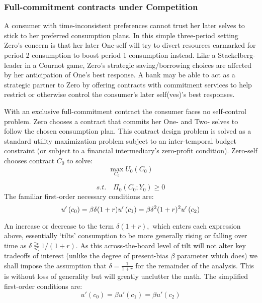 \documentclass[11pt,english]{article}
\theoremstyle{plain}
\theoremstyle{plain}
\theoremstyle{plain}
\begin{document}
\subsubsection{Full-commitment contracts under Competition}

\label{sec-FCC} A consumer with time-inconsistent preferences cannot
trust her later selves to stick to her preferred consumption plans.
In this simple three-period setting Zero's concern is that her later
One-self will try to divert resources earmarked for period 2 consumption
to boost period 1 consumption instead. Like a Stackelberg-leader in
a Cournot game, Zero's strategic saving/borrowing choices are affected
by her anticipation of One's best response. A bank may be able to
act as a strategic partner to Zero by offering contracts with commitment
services to help restrict or otherwise control the consumer's later
self(ves)'s best responses.

With an exclusive full-commitment contract the consumer faces no self-control
problem. Zero chooses a contract that commits her One- and Two- selves
to follow the chosen consumption plan. This contract design problem
is solved as a standard utility maximization problem subject to an
inter-temporal budget constraint (or subject to a financial intermediary's
zero-profit condition). Zero-self chooses contract $C_{0}$ to solve:
\begin{equation}
\max_{C_{0}}U_{0}(C_{0})\label{eq:cobj0}
\end{equation}

\begin{equation}
s.t.\quad\Pi_{0}(C_{0};Y_{0})\geq0\label{eq:BPC0}
\end{equation}
The familiar first-order necessary conditions are: 
\begin{equation}
u'\left(c_{0}\right)=\beta\delta(1+r)u'\left(c_{1}\right)=\beta\delta^{2}(1+r)^{2}\\ u'\left(c_{2}\right)
\end{equation}

An increase or decrease to the term $\delta(1+r),$ which enters each
expression above, essentially `tilts' consumption to be more generally
rising or falling over time as $\delta\gtreqless1/(1+r)$. As this
across-the-board level of tilt will not alter key tradeoffs of interest
(unlike the degree of present-bias $\beta$ parameter which does)
we shall impose the assumption that $\delta=\frac{1}{1+r}$ for the
remainder of the analysis. This is without loss of generality but
will greatly unclutter the math. The simplified first-order conditions
are: 
\begin{equation}
u'\left(c_{0}\right)=\beta u'\left(c_{1}\right)=\beta u'\left(c_{2}\right)\label{eq:FOC_comp}
\end{equation}
\end{document}
